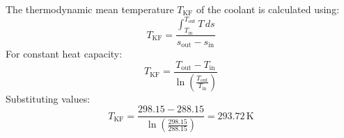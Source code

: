 The thermodynamic mean temperature \( T_{\text{KF}} \) of the coolant is calculated using:  
\[
T_{\text{KF}} = \frac{\int_{T_{\text{in}}}^{T_{\text{out}}} T \, ds}{s_{\text{out}} - s_{\text{in}}}
\]  
For constant heat capacity:  
\[
T_{\text{KF}} = \frac{T_{\text{out}} - T_{\text{in}}}{\ln\left(\frac{T_{\text{out}}}{T_{\text{in}}}\right)}
\]  
Substituting values:  
\[
T_{\text{KF}} = \frac{298.15 - 288.15}{\ln\left(\frac{298.15}{288.15}\right)} = 293.72 \, \text{K}
\]